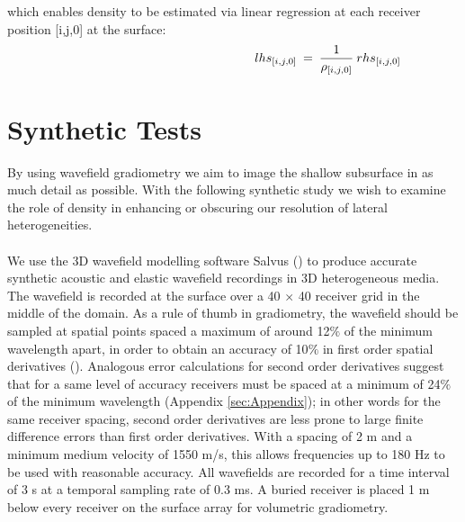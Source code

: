 \documentclass[]{article}
\begin{document}
	which enables density to be estimated via linear regression at each receiver position [i,j,0] at the surface:
	\begin{align} \shoveright \shoveright \shoveright \shoveright \shoveright \shoveright \shoveright \shoveright \shoveright \shoveright \shoveright \shoveright \shoveright \shoveright 
		\shoveright \shoveright 
		lhs_{[i,j,0]} \:&=\: \frac{1}{\rho_{[i,j,0]}}   \: rhs_{[i,j,0]}
		\label{eq:FS_RHO_linREG}   
	\end{align}
	
	
	\section{Synthetic Tests} \label{sec:synstudie}
	By using wavefield gradiometry we aim to image the shallow subsurface in as much detail as possible. With the following synthetic study we wish to examine the role of density in enhancing or obscuring our resolution of lateral heterogeneities.\\ \\
	We use the 3D wavefield modelling software Salvus (\cite{afanasiev2019modular}) to produce accurate synthetic acoustic and elastic wavefield recordings in 3D heterogeneous media. The wavefield is recorded at the surface over a 40 $\times$ 40 receiver grid in the middle of the domain. As a rule of thumb in gradiometry, the wavefield should be sampled at spatial points spaced a maximum of around 12$\%$ of the minimum wavelength apart, in order to obtain an accuracy of 10$\%$ in first order spatial derivatives (\cite{Langston1}). Analogous error calculations for second order derivatives suggest that for a same level of accuracy receivers must be spaced at a minimum of 24$\%$ of the minimum wavelength (Appendix \ref{sec:Appendix}); in other words for the same receiver spacing, second order derivatives are less prone to large finite difference errors than first order derivatives. With a spacing of 2 m and a minimum medium velocity of 1550 m/s, this allows frequencies up to 180 Hz to be used with reasonable accuracy. All wavefields are recorded for a time interval of 3 s at a temporal sampling rate of 0.3 ms. A buried receiver is placed 1 m below every receiver on the surface array for volumetric gradiometry.
	
\end{document}
